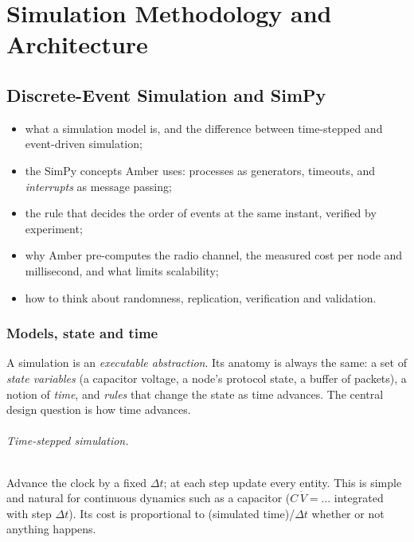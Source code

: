 \part{Simulation Methodology and Architecture}

\chapter{Discrete-Event Simulation and SimPy}
\label{ch:des}

\begin{defbox}
\begin{itemize}
 \item what a simulation model is, and the difference between time-stepped and event-driven simulation;
 \item the SimPy concepts Amber uses: processes as generators, timeouts, and \emph{interrupts} as message passing;
 \item the rule that decides the order of events at the same instant, verified by experiment;
 \item why Amber pre-computes the radio channel, the measured cost per node and millisecond, and what limits scalability;
 \item how to think about randomness, replication, verification and validation.
\end{itemize}
\end{defbox}

\section{Models, state and time}
\label{sec:desmodel}

A simulation is an \emph{executable abstraction}. Its anatomy is always the same: a set of \emph{state variables} (a
capacitor voltage, a node's protocol state, a buffer of packets), a notion of \emph{time}, and \emph{rules} that change the state as time advances. The central design question is how time advances.

\paragraph{Time-stepped simulation.}
Advance the clock by a fixed $\Delta t$; at each step update every entity. This is simple and natural for
continuous dynamics such as a capacitor ($C\,\dot V=\dots$ integrated with step $\Delta t$). Its cost is proportional to
(simulated time)/$\Delta t$ whether or not anything happens.

